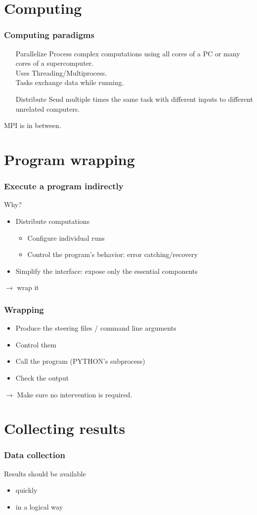 \documentclass[14pt]{beamer}
\begin{document}
\section{Computing}
\begin{frame}
\frametitle{Computing paradigms}
\begin{itemize}
\item[Parallelize] Process complex computations using all cores of a PC or many cores of a supercomputer.\\ Uses Threading/Multiprocess.\\ Tasks exchange data while running.
\pause
\item[Distribute] Send multiple times the same task with different inputs to different unrelated computers.
\end{itemize}
\pause
MPI is in between.
\end{frame}

\section{Program wrapping}
\begin{frame}
\frametitle{Execute a program indirectly}
Why?
\begin{itemize}
\item Distribute computations
\begin{itemize}
\item Configure individual runs
\item Control the program's behavior: error catching/recovery
\end{itemize}
\pause
\item Simplify the interface: expose only the essential components
\end{itemize}
\pause
\alert{$\rightarrow$ wrap it}
\end{frame}

\begin{frame}
\frametitle{Wrapping}
\begin{itemize}
\item Produce the steering files / command line arguments
\item Control them
\item Call the program (PYTHON's subprocess)
\item Check the output
\end{itemize}
\pause
\alert{$\rightarrow$ Make sure no intervention is required.}
\end{frame}


\section{Collecting results}
\begin{frame}
\frametitle{Data collection}
Results should be available
\begin{itemize}
\item quickly
\item in a logical way
\end{itemize}
\end{frame}
\end{document}
